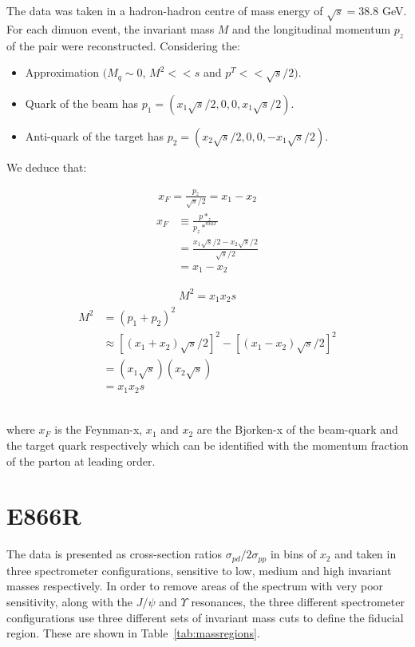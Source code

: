 \documentclass[11pt]{article}
\begin{document}
The data was taken in a hadron-hadron centre of mass energy of $\sqrt{s}=38.8$ GeV.
For each dimuon event, the invariant mass $M$ and the longitudinal momentum $p_z$ of the pair were reconstructed. Considering the:
\begin{itemize} 
\item Approximation $(M_q \sim 0$, $M^2 << s$ and $p^T << \sqrt{s}/2)$.
\item Quark of the beam has $p_1 = (x_1\sqrt{s}/2,0,0,x_1\sqrt{s}/2)$.
\item Anti-quark of the target has $p_2 = (x_2\sqrt{s}/2,0,0,-x_1\sqrt{s}/2)$.
\end{itemize}
We deduce that:\\
\begin{minipage}[!h]{0.49\linewidth}
\begin{align*} \boxed{x_F = \frac{p_{z}}{\sqrt{s}/2} = x_1 - x_2} \end{align*}
\begin{align*}
x_F &\equiv \frac{p*_z}{p_z*^{max}} \\
&= \frac{x_1\sqrt{s}/2 - x_2\sqrt{s}/2}{\sqrt{s}/2}\\
&= x_1 - x_2
\end{align*}
\end{minipage}
\begin{minipage}[!h]{0.49\linewidth}
\begin{align*} \boxed{M^2 = x_1x_2s} \end{align*}
\begin{align*}
    M^2 &= (p_1 + p_2)^2 \\ 
    & \approx [(x_1+x_2)\sqrt{s}/2]^2 - [(x_1-x_2)\sqrt{s}/2]^2\\
    & = (x_1\sqrt{s})(x_2\sqrt{s})\\
    & = x_1x_2s
\end{align*}
\end{minipage}\\
where $x_F$ is the Feynman-x, $x_1$ and $x_2$ are the Bjorken-x of the beam-quark and the target quark respectively which can be identified with the momentum fraction of the parton at leading order.

\section{E866R}
The data is presented as cross-section ratios $\sigma_{pd}/2\sigma_{pp}$ in bins of $x_2$ and taken in three spectrometer configurations, sensitive to low, medium and high invariant
masses respectively. In order to remove areas of the spectrum with very poor sensitivity, along with the $J/\psi$ and $\Upsilon$ resonances,
the three different spectrometer configurations use three different sets of invariant mass cuts to define the fiducial region. These are shown
in Table~\ref{tab:massregions}.
\end{document}
